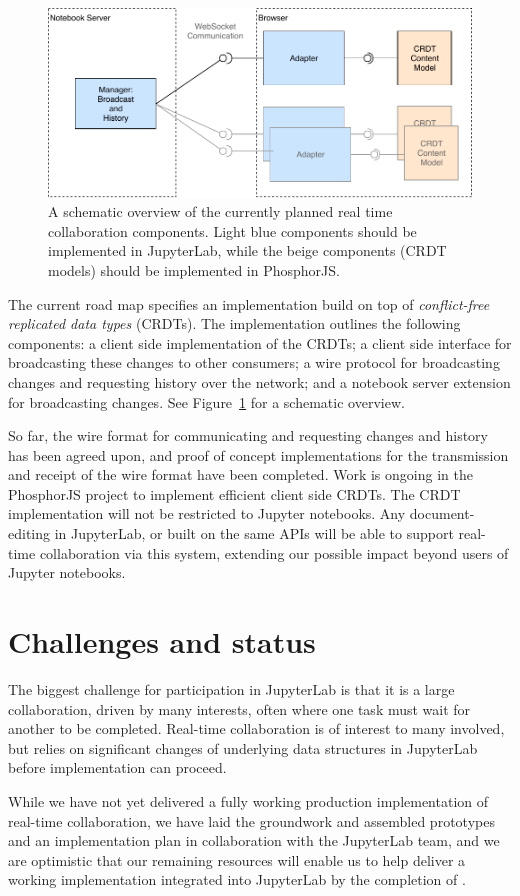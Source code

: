 \documentclass{deliverablereport}
\begin{document}
\begin{figure}[h]
  \centering
  \includegraphics[width=.9\textwidth]{lab-RTC.pdf}
  \caption{A schematic overview of the currently planned real time collaboration components.
    Light blue components should be implemented in JupyterLab, while the beige
    components (CRDT models) should be implemented in PhosphorJS.}
  \label{fig:rtc-components}
\end{figure}

The current road map specifies an implementation build on top of
\emph{conflict-free replicated data types} (CRDTs). The implementation outlines the
following components: a client side implementation of the CRDTs; a client side interface
for broadcasting these changes to other consumers; a wire protocol for broadcasting
changes and requesting history over the network; and a notebook server extension for broadcasting changes. See Figure~\ref{fig:rtc-components} for a schematic overview.

So far, the wire format for communicating and requesting changes and history has been
agreed upon, and proof of concept implementations for the transmission and receipt of the
wire format have been completed. Work is ongoing in the PhosphorJS project to implement
efficient client side CRDTs.
The CRDT implementation will not be restricted to Jupyter notebooks.
Any document-editing in JupyterLab, or built on the same APIs will be able to
support real-time collaboration via this system,
extending our possible impact beyond users of Jupyter notebooks.


\section{Challenges and status}

The biggest challenge for \ODK participation in JupyterLab is that it is a large collaboration, driven by many interests,
often where one task must wait for another to be completed.
Real-time collaboration is of interest to many involved,
but relies on significant changes of underlying data structures in JupyterLab before implementation can proceed.

While we have not yet delivered a fully working production implementation of real-time collaboration,
we have laid the groundwork and assembled prototypes and an implementation plan
in collaboration with the JupyterLab team,
and we are optimistic that our remaining resources will enable us to help deliver a working implementation integrated into JupyterLab by the completion of .
\end{document}
